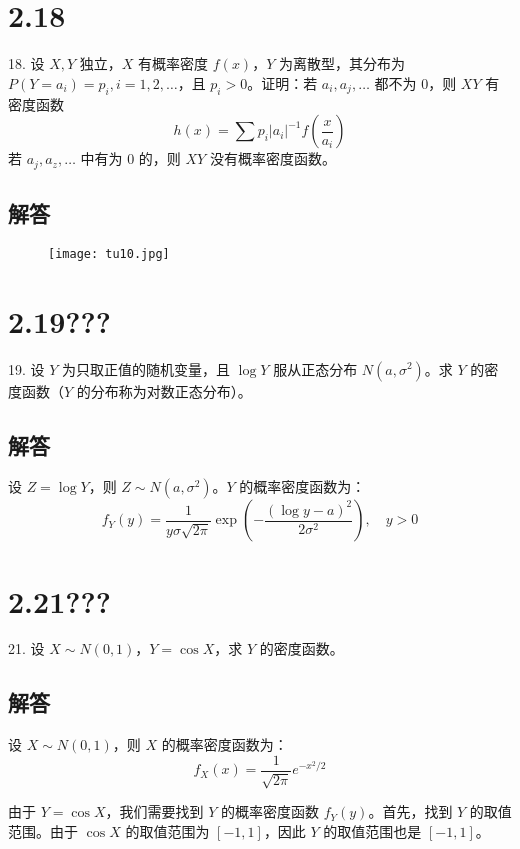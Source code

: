 \documentclass[UTF8]{report}
\theoremstyle{MyLineTheoremStyle} %
\theoremstyle{MyBlockTheoremStyle} %
\theoremstyle{MySubsubsectionStyle} %
\begin{document}
\section{2.18}

18. 设 \(X, Y\) 独立，\(X\) 有概率密度 \(f(x)\)，\(Y\) 为离散型，其分布为 \(P(Y = a_i) = p_i, i = 1, 2, \ldots\)，且 \(p_i > 0\)。证明：若 \(a_i, a_j, \ldots\) 都不为 0，则 \(XY\) 有密度函数
\[
h(x) = \sum p_i |a_i|^{-1} f\left(\frac{x}{a_i}\right)
\]
若 \(a_j, a_z, \ldots\) 中有为 0 的，则 \(XY\) 没有概率密度函数。

\subsection*{解答}

\begin{figure}[H]
    \centering
    \texttt{[image: tu10.jpg]}
\end{figure}


\section{2.19???}

19. 设 \(Y\) 为只取正值的随机变量，且 \(\log Y\) 服从正态分布 \(N(a, \sigma^2)\)。求 \(Y\) 的密度函数（\(Y\) 的分布称为对数正态分布）。

\subsection*{解答}

设 \(Z = \log Y\)，则 \(Z \sim N(a, \sigma^2)\)。\(Y\) 的概率密度函数为：
\[
f_Y(y) = \frac{1}{y\sigma\sqrt{2\pi}} \exp\left(-\frac{(\log y - a)^2}{2\sigma^2}\right), \quad y > 0
\]


\section{2.21???}

21. 设 \(X \sim N(0, 1)\)，\(Y = \cos X\)，求 \(Y\) 的密度函数。

\subsection*{解答}

设 \(X \sim N(0, 1)\)，则 \(X\) 的概率密度函数为：
\[
f_X(x) = \frac{1}{\sqrt{2\pi}} e^{-x^2/2}
\]

由于 \(Y = \cos X\)，我们需要找到 \(Y\) 的概率密度函数 \(f_Y(y)\)。首先，找到 \(Y\) 的取值范围。由于 \(\cos X\) 的取值范围为 \([-1, 1]\)，因此 \(Y\) 的取值范围也是 \([-1, 1]\)。
\end{document}
